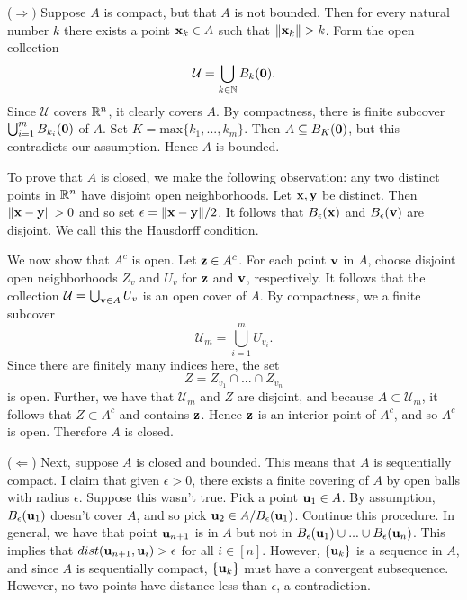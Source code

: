 \documentclass[letterpaper, twoside, 12pt]{book}
\begin{document}
\begin{solution}

    (\(\Rightarrow)\)
    Suppose \(A\) is compact, but that \(A\) is not bounded. Then
    for every natural number \(k\) there exists a point \(\mathbf x_k \in A\)
    such that \(\|\mathbf x_k\| > k \). Form the open collection
    \[ \mathcal U = \bigcup_{k \in \mathbb N} B_{k}(\mathbf 0) .\]
    Since \(\mathcal U\) covers \(\mathbb R^n\), it clearly covers \(A\). 
    By compactness, there is finite subcover 
    \(\bigcup_{i = 1}^{m} B_{k_i}(\mathbf 0) \) of \(A\). 
    Set \(K = \text{max}\{k_1, ..., k_m\}\). Then \(A \subseteq B_{K}(\mathbf 0)\),
    but this contradicts our assumption. Hence \(A\) is bounded.

    To prove that \(A\) is closed, we make the following observation:
    any two distinct points in \(\mathbb R^n\) have disjoint open neighborhoods.
    Let \(\mathbf x, \mathbf y\) be distinct. Then \(\|\mathbf x - \mathbf y\| > 0\)
    and so set \(\epsilon = \|\mathbf x - \mathbf y\| / 2\). It follows that
    \(B_{\epsilon}(\mathbf x)\) and \(B_{\epsilon}(\mathbf v)\) are disjoint.
    We call this the Hausdorff condition.

    We now show that \(A^c\) is open. Let \(\mathbf z \in A^c\). For 
    each point \(\mathbf v\) in \(A\), choose disjoint open neighborhoods
    \(Z_v\) and \(U_v\) for \(\mathbf z\) and \(\mathbf v\), respectively. 
    It follows that the collection \(\mathcal U = \bigcup_{\mathbf v \in A} U_v \) 
    is an open cover of \(A\). By compactness, we a finite subcover
    \[ \mathcal U_m = \bigcup_{i = 1}^m U_{v_i} .\]
    Since there are finitely many indices here, the set
    \[ Z = Z_{v_1} \cap ... \cap Z_{v_n} \]
    is open. Further, we have that \(\mathcal U_m\) and \(Z\)
    are disjoint, and because \(A \subset \mathcal U_m\),
    it follows that \(Z \subset A^c\) and contains \(\mathbf z\).
    Hence \(\mathbf z\) is an interior point of \(A^c\), and so
    \(A^c\) is open. Therefore \(A\) is closed.

    (\(\Leftarrow\))
    Next, suppose \(A\) is closed and bounded. This means that
    \(A\) is sequentially compact. I claim that given \(\epsilon > 0\),
    there exists a finite covering of \(A\) by open balls with
    radius \(\epsilon\). Suppose this wasn't true. Pick a point
    \(\mathbf u_1 \in A\). By assumption, \(B_{\epsilon}(\mathbf u_1)\)
    doesn't cover \(A\), and so pick \(\mathbf u_2 \in A / B_{\epsilon}(\mathbf u_1)\).
    Continue this procedure. In general, we have that point \(\mathbf u_{n + 1}\)
    is in \(A\) but not in \(B_{\epsilon}(\mathbf u_1) \cup ... \cup B_{\epsilon}(\mathbf u_n)\).
    This implies that \(dist(\mathbf u_{n+1}, \mathbf u_i) > \epsilon \) for 
    all \(i \in [n]\). However, \(\{\mathbf u_k\}\) is a sequence in \(A\),
    and since \(A\) is sequentially compact, \(\{\mathbf u_k\}\) must have
    a convergent subsequence. However, no two points have distance less
    than \(\epsilon\), a contradiction.


\end{solution}
\end{document}

